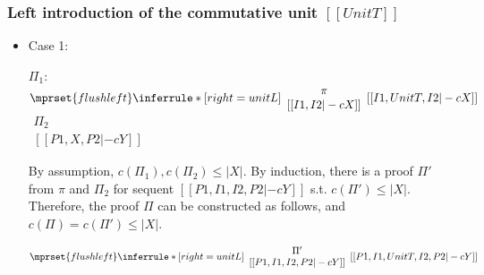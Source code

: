 \subsubsection{Left introduction of the commutative unit $[[UnitT]]$}
\begin{itemize}
\item Case 1:
      \begin{center}
        \scriptsize
        $\Pi_1$:
        \begin{math}
          $$\mprset{flushleft}
          \inferrule* [right={\tiny unitL}] {
            {
              \begin{array}{c}
                \pi \\
                {[[I1, I2 |-c X]]}
              \end{array}
            }
          }{[[I1, UnitT, I2 |-c X]]}
        \end{math}
        \qquad\qquad
        \begin{math}
          \begin{array}{c}
            \Pi_2 \\
            {[[P1, X, P2 |-c Y]]}
          \end{array}
        \end{math}
      \end{center}
      By assumption, $c(\Pi_1),c(\Pi_2)\leq |X|$. By induction, there is a
      proof $\Pi'$ from $\pi$ and $\Pi_2$ for sequent
      $[[P1, I1, I2, P2 |-c Y]]$
      s.t. $c(\Pi')\leq |X|$. Therefore, the proof $\Pi$ can be constructed
      as follows, and $c(\Pi)=c(\Pi')\leq |X|$.
      \begin{center}
        \scriptsize
        \begin{math}
          $$\mprset{flushleft}
          \inferrule* [right={\tiny unitL}] {
            {
              \begin{array}{c}
                \Pi' \\
                {[[P1, I1, I2, P2 |-c Y]]}
              \end{array}
            }
          }{[[P1, I1, UnitT, I2, P2 |-c Y]]}
        \end{math}
      \end{center}


\end{itemize}
